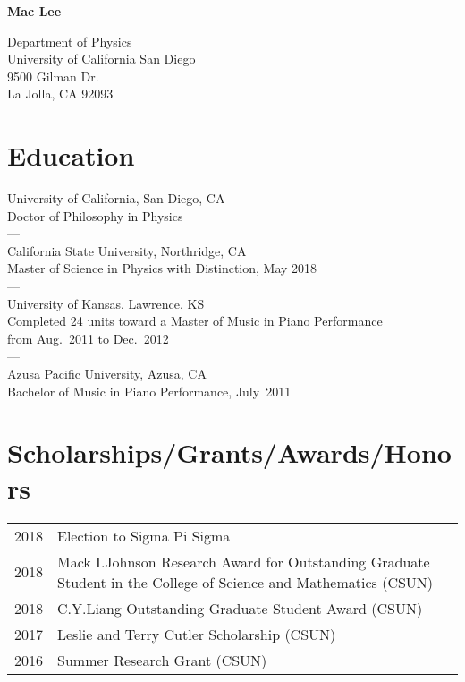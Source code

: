 \documentclass{cv}
\begin{document}
\centerline{\LARGE{\textbf{Mac Lee}}}
\vspace{11pt}
\begin{minipage}[t]{0.4\textwidth}
  Department of Physics\\
  University of California San Diego\\
  9500 Gilman Dr.\\
  La Jolla, CA 92093\\
\end{minipage}
\hfill
\begin{minipage}[t]{0.4\textwidth}
\end{minipage}

\section*{Education}
\begin{adjustwidth}{0.5in}{}
  University of California, San Diego, CA\\
  Doctor of Philosophy in Physics\\
  ---\\
  California State University, Northridge, CA\\
  Master of Science in Physics with Distinction, May 2018\\
  ---\\
  University of Kansas, Lawrence, KS\\
  Completed 24 units toward a Master of Music in Piano Performance\\
  from Aug.~2011 to Dec.~2012\\
  ---\\
  Azusa Pacific University, Azusa, CA\\
  Bachelor of Music in Piano Performance, July~2011
\end{adjustwidth}

\section*{Scholarships/Grants/Awards/Honors}
\begin{adjustwidth}{0.5in}{}
  \vspace{-1em}
  \begin{tabularx}{\textwidth}{@{\hspace*{\leftmargin}}lX}
    2018 & Election to Sigma Pi Sigma\\
    2018 & Mack I.\@ Johnson Research Award for Outstanding Graduate Student in
    the College of Science and Mathematics (CSUN)\\
    2018 & C.\@ Y.\@ Liang Outstanding Graduate Student Award (CSUN)\\
    2017 & Leslie and Terry Cutler Scholarship (CSUN)\\
    2016 & Summer Research Grant (CSUN)\\
  \end{tabularx}
  \vspace{-2.5em}
\end{adjustwidth}
\end{document}
